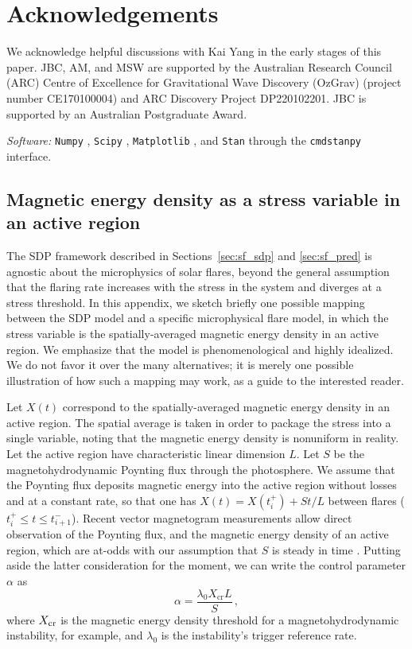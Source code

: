\section*{Acknowledgements}
We acknowledge helpful discussions with Kai Yang in the early stages of this paper. JBC, AM, and MSW are supported by the Australian Research Council (ARC) Centre of Excellence for Gravitational Wave Discovery (OzGrav) (project number CE170100004) and ARC Discovery Project DP220102201. JBC is supported by an Australian Postgraduate Award.

\emph{Software:} \texttt{Numpy} \citep{Harris2020}, \texttt{Scipy} \citep{Virtanen2020}, \texttt{Matplotlib} \citep{Hunter2007}, and \texttt{Stan} \citep{stan2022} through the \texttt{cmdstanpy} interface.

\begin{subappendices}

\section{Magnetic energy density as a stress variable in an active region} \label{app:sf_toy}
The SDP framework described in Sections~\ref{sec:sf_sdp} and \ref{sec:sf_pred} is agnostic about the microphysics of solar flares, beyond the general assumption that the flaring rate increases with the stress in the system and diverges at a stress threshold. In this appendix, we sketch briefly one possible mapping between the SDP model and a specific microphysical flare model, in which the stress variable is the spatially-averaged magnetic energy density in an active region. We emphasize that the model is phenomenological and highly idealized. We do not favor it over the many alternatives; it is merely one possible illustration of how such a mapping may work, as a guide to the interested reader.

Let $X(t)$ correspond to the spatially-averaged magnetic energy density in an active region. The spatial average is taken in order to package the stress into a single variable, noting that the magnetic energy density is nonuniform in reality. Let the active region have characteristic linear dimension $L$. Let $S$ be the magnetohydrodynamic Poynting flux through the photosphere. We assume that the Poynting flux deposits magnetic energy into the active region without losses and at a constant rate, so that one has $X(t) = X(t_i^+) + S t /L$ between flares ($t_i^+ \leq t \leq t_{i+1}^-$). Recent vector magnetogram measurements allow direct observation of the Poynting flux, and the magnetic energy density of an active region, which are at-odds with our assumption that $S$ is steady in time \citep{Fisher2012, Sun2012, Sun2017, Sahu2022}. Putting aside the latter consideration for the moment, we can write the control parameter $\alpha$ as
\begin{equation}
    \alpha = \frac{\lambda_0 X_\textrm{cr} L}{S}\,,
\end{equation}
where $X_{\rm cr}$ is the magnetic energy density threshold for a magnetohydrodynamic instability, for example, and $\lambda_0$ is the instability's trigger reference rate.


\end{subappendices}
